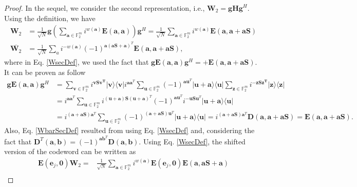 \documentclass[lettersize,journal,onecolumn]{IEEEtran}
\begin{document}
\begin{proof}
In the sequel, we consider the second representation, i.e., $\mathbf{W}_2 = \mathbf{gHg}^H$. Using the definition, we have
\begin{align}
		\mathbf{W}_2 & = \frac{1}{\sqrt{N}}\mathbf{g}\left(\sum_{\mathbf{a} \in \mathbb{F}^m_2} i^{w\left(\mathbf{a}\right)}\mathbf{E}\left(\mathbf{a},\mathbf{a}\right)\right)\mathbf{g}^H = \frac{1}{\sqrt{N}}\sum_{\mathbf{a} \in \mathbb{F}^m_2} i^{w(\mathbf{a})}\mathbf{E}\left(\mathbf{a, a+aS} \right) \label{WsecDef}  \\ 
		\overline{\mathbf{W}_2} &= \frac{1}{\sqrt{N}} \sum_a i^{-w(\mathbf{a})}(-1)^{\mathbf{a}\left(\mathbf{a}\mathbf{S} + \mathbf{a}\right)^T} 
		\mathbf{E}\left(\mathbf{a, a+aS} \right), \label{WbarSecDef}
\end{align}
where in Eq. \eqref{WsecDef}, we used the fact that $\mathbf{g}\mathbf{E}(\mathbf{a},\mathbf{a}) \mathbf{g}^H = +\mathbf{E}(\mathbf{a,a+a S})$. It can be proven as follow
\begin{align*}
	\mathbf{g} \mathbf{E}(\mathbf{a,a}) \mathbf{g}^H &=\sum_{\mathbf{v} \in \mathbb{F}^m_2}{i^{\mathbf{v S v^T}} |\mathbf{v}\rangle  \langle \mathbf{v}|} i^{\mathbf{a}\mathbf{a}^T}\sum_{\mathbf{u} \in \mathbb{F}^m_2}{(-1)^{\mathbf{a}\mathbf{u}^T} |\mathbf{u+a} \rangle  \langle  \mathbf{u}|}\sum_{\mathbf{z} \in \mathbb{F}^m_2}{i^{-\mathbf{z S z^T}} |\mathbf{z} \rangle  \langle \mathbf{z}|} \nonumber \\
	&= i^{\mathbf{a}\mathbf{a}^T}\sum_{\mathbf{u} \in \mathbb{F}^m_2}{i^{\mathbf{(u+a)S}(\mathbf{u+a})^T} (-1)^{\mathbf{a}\mathbf{u}^T}i^{-\mathbf{uS}\mathbf{u}^T} |\mathbf{u+a} \rangle  \langle \mathbf{u}|} \nonumber \\
	&= i^{\left(\mathbf{a+aS}\right)\mathbf{a}^T}\sum_{\mathbf{u} \in \mathbb{F}^m_2}{(-1)^{\left(\mathbf{a+aS} \right)\mathbf{u}^T} |\mathbf{u+a} \rangle  \langle \mathbf{u}|}= i^{(\mathbf{a+aS})\mathbf{a}^T}\mathbf{D}(\mathbf{a, a+aS}) = \mathbf{E}(\mathbf{a, a+aS}).
\end{align*}
Also, Eq. \eqref{WbarSecDef} resulted from using Eq. \eqref{WsecDef} and, considering the fact that $\mathbf{D}^T\left(\mathbf{a, b}\right) = \left(-1\right)^{\mathbf{a b}^T} \mathbf{D}\left(\mathbf{a, b}\right)$. Using  Eq. \eqref{WsecDef}, the shifted version of the codeword can be written as
\begin{align}
	\mathbf{E}\left(\mathbf{e}_j, \mathbf{0}\right)\mathbf{W}_2 = &\frac{1}{\sqrt{N}} \sum_{\mathbf{a} \in \mathbb{F}^m_2} i^{w(\mathbf{a})}\mathbf{E}(\mathbf{e}_j,\mathbf{0})\mathbf{E}\left(\mathbf{a},\mathbf{a}\mathbf{S} + \mathbf{a}\right)  \nonumber \\ 

\end{align}
\end{proof}
\end{document}
